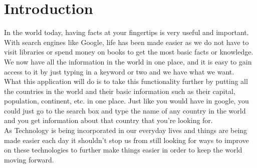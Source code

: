 \documentclass[twoside, a4paper, 12pt]{report}
\begin{document}
\chapter{Introduction}
In the world today, having facts at your fingertips is very useful and important. With search engines like Google, life has been made easier as we do not have to visit libraries or spend money on books to get the most basic facts or knowledge. We now have all the information in the world in one place, and it is easy to gain access to it by just typing in a keyword or two and we have what we want.\\
\indent
What this application will do is to take this functionality further by putting all the countries in the world and their basic information such as their capital, population, continent, etc. in one place. Just like you would have in google, you could just go to the search box and type the name of any country in the world and you get information about that country that you're looking for.\\
\indent
As Technology is being incorporated in our everyday lives and things are being made easier each day it shouldn't stop us from still looking for ways to improve on these technologies to further make things easier in order to keep the world moving forward.



\end{document}
